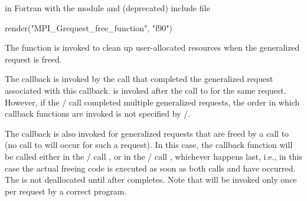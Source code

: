 \par\noindent
in Fortran with the  module and (deprecated)  include file

\begin{mpi-binding}
    render("MPI_Grequest_free_function", "f90")
\end{mpi-binding}

\par\noindent
The  function is invoked to clean up user-allocated
resources when the generalized request is freed. 

The  callback is invoked by the 
%
%
%
%
%
%
%
%
 call that
completed the generalized request associated with this
callback.  is invoked after the call to
 for the same request.  However, if the \MPI/ call
completed multiple generalized requests, the order in which
 callback functions are invoked is not specified by
\MPI/.
 
The  callback 
is also invoked for generalized requests that are freed by a call to
 (no call to 
%
%
%
%
%
%
%
%
will occur for
such a request).  In this case, the callback
function will be called either in the \MPI/ call
, or in the \MPI/ call
, whichever happens 
last, i.e., 
in this case the actual freeing code is executed
as soon as both calls  and
 have occurred. 
The  is not deallocated until after
 completes.
Note that  will be 
invoked only once per request by a correct program. 


